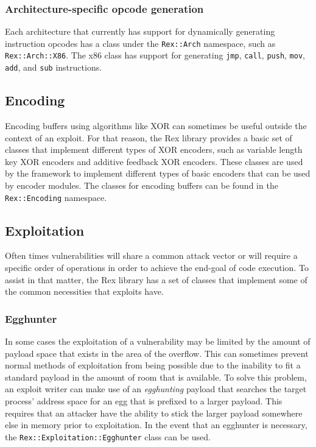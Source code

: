 \documentclass{report}
\begin{document}
            \subsubsection{Architecture-specific opcode generation}

\par
Each architecture that currently has support for dynamically
generating instruction opcodes has a class under the
\texttt{Rex::Arch} namespace, such as \texttt{Rex::Arch::X86}.  The
x86 class has support for generating \texttt{jmp}, \texttt{call},
\texttt{push}, \texttt{mov}, \texttt{add}, and \texttt{sub}
instructions.

        \subsection{Encoding}

\par
Encoding buffers using algorithms like XOR can sometimes be useful
outside the context of an exploit.  For that reason, the Rex library
provides a basic set of classes that implement different types of
XOR encoders, such as variable length key XOR encoders and additive
feedback XOR encoders.  These classes are used by the framework to
implement different types of basic encoders that can be used by
encoder modules.  The classes for encoding buffers can be found in
the \texttt{Rex::Encoding} namespace.

        \subsection{Exploitation}

\par
Often times vulnerabilities will share a common attack vector or
will require a specific order of operations in order to achieve the
end-goal of code execution.  To assist in that matter, the Rex
library has a set of classes that implement some of the common
necessities that exploits have.

            \subsubsection{Egghunter}

\par
In some cases the exploitation of a vulnerability may be limited by
the amount of payload space that exists in the area of the overflow.
This can sometimes prevent normal methods of exploitation from being
possible due to the inability to fit a standard payload in the
amount of room that is available.  To solve this problem, an exploit
writer can make use of an \textit{egghunting} payload that searches
the target process' address space for an egg that is prefixed to a
larger payload.  This requires that an attacker have the ability to
stick the larger payload somewhere else in memory prior to
exploitation.  In the event that an egghunter is necessary, the
\texttt{Rex::Exploitation::Egghunter} class can be used.
\end{document}
